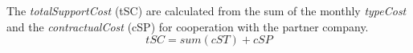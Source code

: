 The \textit{totalSupportCost} (\gls{tSC}) are calculated from the sum of the monthly \textit{typeCost} and the \textit{contractualCost} (\gls{cSP}) for cooperation with the partner company.
\begin{equation}
\label{func:totalSupportCost}
    tSC = sum (cST) + cSP
\end{equation}